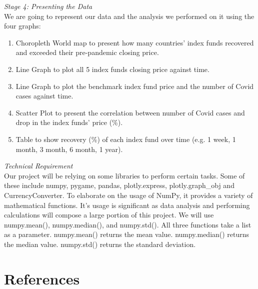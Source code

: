 \documentclass[fontsize=11pt]{article}
\begin{document}
\emph{Stage 4: Presenting the Data}\\
We are going to represent our data and the analysis we performed on it using the four graphs:
\begin{enumerate}
\setcounter{enumi}{0}
\item Choropleth World map to present how many countries’ index funds recovered and exceeded their pre-pandemic closing price. 
\item Line Graph to plot all 5 index funds closing price against time. 
\item Line Graph to plot the benchmark index fund price and the number of Covid cases against time.
\item Scatter Plot to present the correlation between number of Covid cases and drop in the index funds’ price (\%).
\item Table to show recovery (\%) of each index fund over time (e.g. 1 week, 1 month, 3 month, 6 month, 1 year).\\
\end{enumerate}
\emph{Technical Requirement}\\
Our project will be relying on some libraries to perform certain tasks. Some of these include numpy, pygame, pandas, plotly.express, plotly.graph\_obj and CurrencyConverter. To elaborate on the usage of NumPy, it provides a variety of mathematical functions. It’s usage is significant as data analysis and performing calculations will compose a large portion of this project. We will use numpy.mean(), numpy.median(), and numpy.std(). All three functions take a list as a parameter. numpy.mean() returns the mean value. numpy.median() returns the median value. numpy.std() returns the standard deviation.
\pagebreak

\section*{References}
\end{document}
